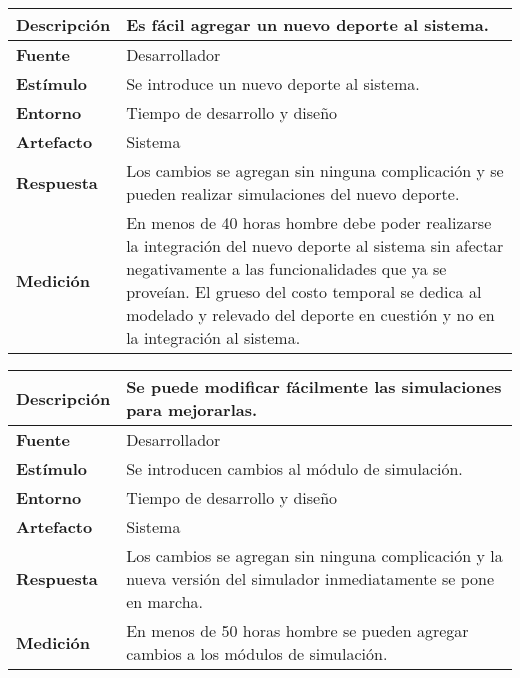\begin{center}
  \begin{tabular}{| l | p{10cm} | }
    \hline
	\textbf{Descripción} & Es fácil agregar un nuevo deporte al sistema.\\  \hline
	\textbf{Fuente} & Desarrollador\\  \hline
	\textbf{Estímulo} & Se introduce un nuevo deporte al sistema.\\  \hline
	\textbf{Entorno} & Tiempo de desarrollo y diseño\\  \hline
	\textbf{Artefacto} & Sistema\\  \hline
	\textbf{Respuesta} & Los cambios se agregan sin ninguna complicación y se pueden realizar simulaciones del nuevo deporte.\\  \hline
	\textbf{Medición} & En menos de 40 horas hombre debe poder realizarse la integración del nuevo deporte al sistema sin afectar negativamente a las funcionalidades que ya se proveían. El grueso del costo temporal se dedica al modelado y relevado del deporte en cuestión y no en la integración al sistema.\\  \hline
  \end{tabular}
\end{center}

\begin{center}
  \begin{tabular}{| l | p{10cm} | }
    \hline
	\textbf{Descripción} & Se puede modificar fácilmente las simulaciones para mejorarlas.\\  \hline
	\textbf{Fuente} & Desarrollador\\  \hline
	\textbf{Estímulo} & Se introducen cambios al módulo de simulación.\\  \hline
	\textbf{Entorno} & Tiempo de desarrollo y diseño\\  \hline
	\textbf{Artefacto} & Sistema\\  \hline
	\textbf{Respuesta} & Los cambios se agregan sin ninguna complicación y la nueva versión del simulador inmediatamente se pone en marcha.\\  \hline
	\textbf{Medición} & En menos de 50 horas hombre se pueden agregar cambios a los módulos de simulación.\\  \hline
  \end{tabular}
\end{center}

